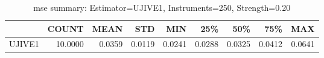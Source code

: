 \begin{table}[ht]
\centering
\caption{mse summary: Estimator=UJIVE1, Instruments=250, Strength=0.20}
\begin{tabular}{lrrrrrrrr}
\toprule
 & COUNT & MEAN & STD & MIN & 25\% & 50\% & 75\% & MAX \\
\midrule
UJIVE1 & 10.0000 & 0.0359 & 0.0119 & 0.0241 & 0.0288 & 0.0325 & 0.0412 & 0.0641 \\
\bottomrule
\end{tabular}
\end{table}
